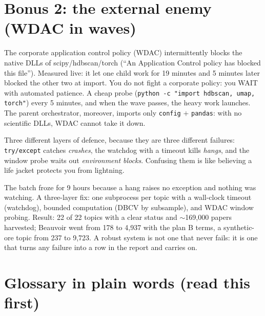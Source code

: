 \documentclass[11pt,a4paper]{article}
\begin{document}
\section{Bonus 2: the external enemy (WDAC in waves)}

The corporate application control policy (WDAC) intermittently blocks the native DLLs of
scipy/hdbscan/torch (``An Application Control policy has blocked this file''). Measured live: it
let one child work for 19 minutes and 5 minutes later blocked the other two at import. You do
not fight a corporate policy: you WAIT with automated patience. A cheap probe
(\texttt{python -c "import hdbscan, umap, torch"}) every 5 minutes, and when the wave passes,
the heavy work launches. The parent orchestrator, moreover, imports only \texttt{config} $+$
\texttt{pandas}: with no scientific DLLs, WDAC cannot take it down.

\begin{ojo}
Three different layers of defence, because they are three different failures:
\texttt{try/except} catches \emph{crashes}, the watchdog with a timeout kills \emph{hangs}, and
the window probe waits out \emph{environment blocks}. Confusing them is like believing a life
jacket protects you from lightning.
\end{ojo}

\begin{resumen}
The batch froze for 9 hours because a hang raises no exception and nothing was watching. A
three-layer fix: one subprocess per topic with a wall-clock timeout (watchdog), bounded
computation (DBCV by subsample), and WDAC window probing. Result: 22 of 22 topics with a clear
status and $\sim$169,000 papers harvested; Beauvoir went from 178 to 4,937 with the plan B
terms, a synthetic-ore topic from 237 to 9,723. A robust system is not one that never fails: it is one that
turns any failure into a row in the report and carries on.
\end{resumen}
\clearpage
{}
{}

\section{Glossary in plain words (read this first)}
\end{document}
